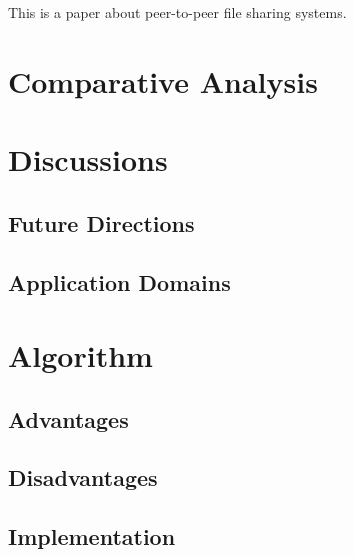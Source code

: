 \documentclass[12pt, a4paper]{article}
\begin{document}
This is a paper about peer-to-peer file sharing systems\cite{saroiu2001measurement}.

\section{Comparative Analysis}


\section{Discussions}

\subsection{Future Directions}

\subsection{Application Domains}


\section{Algorithm}

\subsection{Advantages}

\subsection{Disadvantages}

\subsection{Implementation}





\newpage


\end{document}
